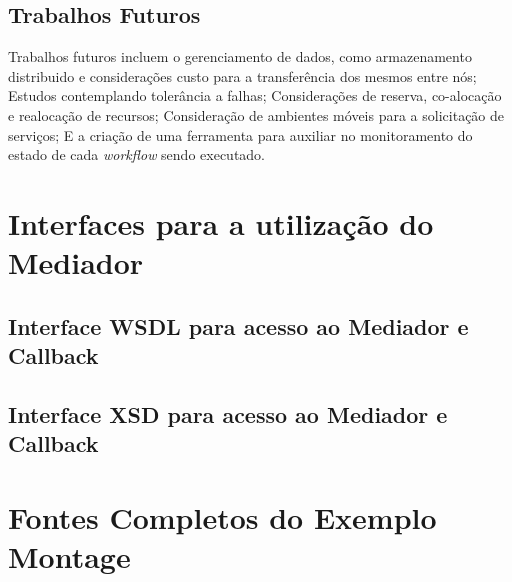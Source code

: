 \documentclass[12pt]{report} %
\begin{document}
    \section{Trabalhos Futuros}
	Trabalhos futuros incluem o gerenciamento de dados, como armazenamento distribuido e considerações custo para a transferência dos mesmos entre nós;
	Estudos contemplando tolerância a falhas;
	Considerações de reserva, co-alocação e realocação de recursos;
	Consideração de ambientes móveis para a solicitação de serviços;
	E a criação de uma ferramenta para auxiliar no monitoramento do estado de cada \textit{workflow} sendo executado.	

\appendix

  \chapter{Interfaces para a utilização do Mediador}
    \section{Interface WSDL para acesso ao Mediador e Callback}
    
    \pagebreak
    \section{Interface XSD para acesso ao Mediador e Callback}
    
  
  \chapter{Fontes Completos do Exemplo Montage}   
  \label{chap:FontesMontage}
        
    
    

    
    
\end{document}
